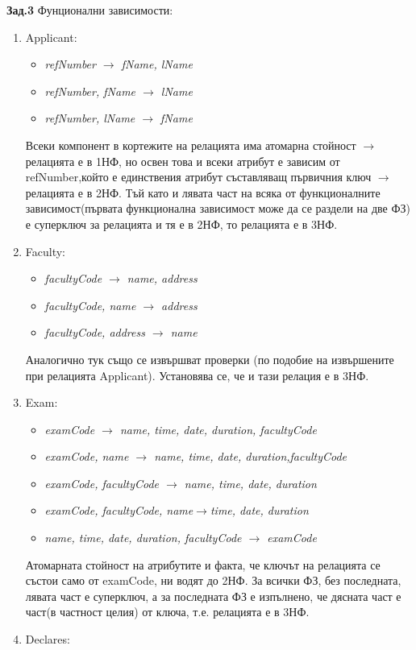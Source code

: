 \documentclass[a4paper,12pt]{article}
\begin{document}
\textbf {Зад.3}
Фунционални зависимости:
\begin{enumerate}
\item Applicant:
\begin {itemize}
\item\textit{refNumber $\rightarrow$ fName, lName}
\item \textit{refNumber, fName $\rightarrow$ lName}
\item \textit{refNumber, lName $\rightarrow$ fName}
\end{itemize}
Всеки компонент в кортежите на релацията има атомарна стойност $\longrightarrow$ релацията е в 1НФ, но освен това и всеки атрибут е зависим от refNumber,който е единствения атрибут съставляващ първичния ключ $\longrightarrow$ релацията е в 2НФ. Тъй като и лявата част на всяка от функционалните зависимост(първата функционална зависимост може да се раздели на две ФЗ) е суперключ за релацията и тя е в 2НФ, то релацията е в 3НФ.
\item Faculty:
\begin{itemize}
\item\textit{facultyCode $\rightarrow$ name, address}
\item \textit{facultyCode, name $\rightarrow$ address}
\item \textit{facultyCode, address $\rightarrow$ name}
\end{itemize}
Аналогично тук също се извършват проверки (по подобие на извършените при релацията Applicant). Установява се, че и тази релация е в 3НФ.
\item Exam:
\begin{itemize}
\item\textit{examCode $\rightarrow$ name, time, date, duration, facultyCode}
\item \textit{examCode, name $\rightarrow$ name, time, date, duration,facultyCode}
\item \textit{examCode, facultyCode $\rightarrow$ name, time, date, duration}
\item \textit{examCode, facultyCode, name$\rightarrow$time, date, duration}
\item\textit{name, time, date, duration, facultyCode $\rightarrow$ examCode }
\end{itemize}
Атомарната стойност на атрибутите и факта, че ключът на релацията се състои само от examCode, ни водят до 2НФ. За всички ФЗ, без последната, лявата част е суперключ, а за последната ФЗ е изпълнено, че дясната част е част(в частност целия) от ключа, т.е. релацията е в 3НФ.
\item Declares: 

\end{enumerate}
\end{document}
